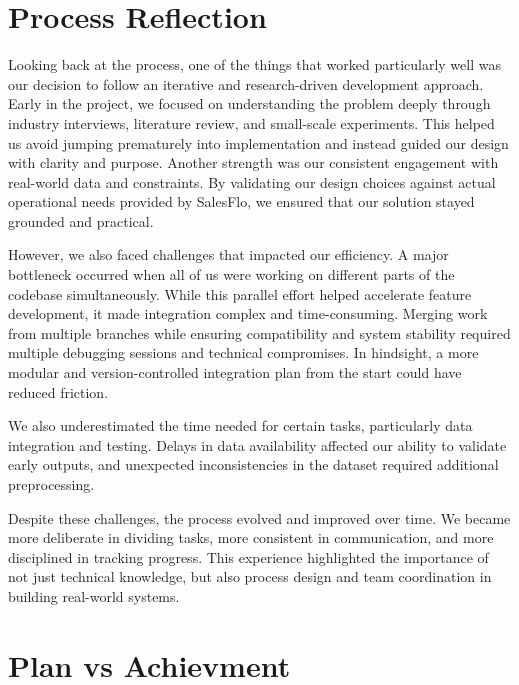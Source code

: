 \section{Process Reflection}
Looking back at the process, one of the things that worked particularly well was our decision to follow an iterative and research-driven development approach. Early in the project, we focused on understanding the problem deeply through industry interviews, literature review, and small-scale experiments. This helped us avoid jumping prematurely into implementation and instead guided our design with clarity and purpose.
Another strength was our consistent engagement with real-world data and constraints. By validating our design choices against actual operational needs provided by SalesFlo, we ensured that our solution stayed grounded and practical.

However, we also faced challenges that impacted our efficiency. A major bottleneck occurred when all of us were working on different parts of the codebase simultaneously. While this parallel effort helped accelerate feature development, it made integration complex and time-consuming. Merging work from multiple branches while ensuring compatibility and system stability required multiple debugging sessions and technical compromises. In hindsight, a more modular and version-controlled integration plan from the start could have reduced friction.

We also underestimated the time needed for certain tasks, particularly data integration and testing. Delays in data availability affected our ability to validate early outputs, and unexpected inconsistencies in the dataset required additional preprocessing.

Despite these challenges, the process evolved and improved over time. We became more deliberate in dividing tasks, more consistent in communication, and more disciplined in tracking progress. This experience highlighted the importance of not just technical knowledge, but also process design and team coordination in building real-world systems.

\section{Plan vs Achievment}
